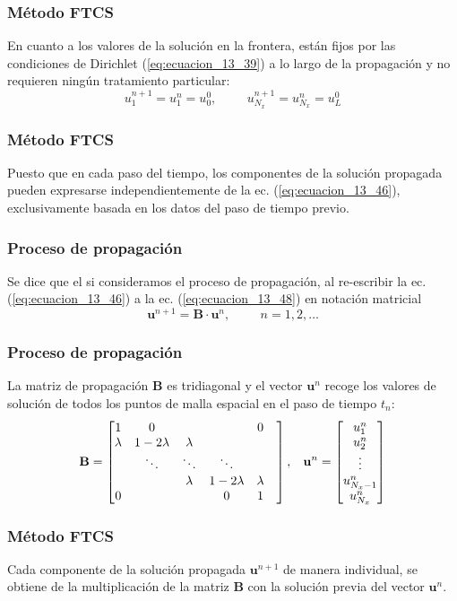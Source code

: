 \documentclass[12pt]{beamer}
\begin{document}
\begin{frame}
\frametitle{Método FTCS}
En cuanto a los valores de la solución en la frontera, están fijos por las condiciones de Dirichlet (\ref{eq:ecuacion_13_39}) a lo largo de la propagación y no requieren ningún tratamiento particular:
\begin{equation}
u_{1}^{n + 1} = u_{1}^{n} = u_{0}^{0}, \hspace{1cm} u_{N_{x}}^{n + 1} = u_{N_{x}}^{n} = u_{L}^{0}
\label{eq:ecuacion_13_48}
\end{equation}
\end{frame}
\begin{frame}
\frametitle{Método FTCS}
Puesto que en cada paso del tiempo, los componentes de la solución propagada pueden expresarse independientemente de la ec. (\ref{eq:ecuacion_13_46}), exclusivamente basada en los datos del paso de tiempo previo.
\end{frame}
\begin{frame}
\frametitle{Proceso de propagación}
Se dice que el  si consideramos el proceso de propagación, al re-escribir la ec. (\ref{eq:ecuacion_13_46}) a la ec. (\ref{eq:ecuacion_13_48}) en notación matricial
\begin{equation}
\mathbf{u}^{n + 1} =  \mathbf{B} \cdot \mathbf{u}^{n}, \hspace{1cm} n = 1, 2, \ldots
\label{eq:ecuacion_13_49}
\end{equation}
\end{frame}
\begin{frame}
\frametitle{Proceso de propagación}
La matriz de propagación $\mathbf{B}$ es tridiagonal y el vector $\mathbf{u}^{n}$ recoge los valores de solución de todos los puntos de malla espacial en el paso de tiempo $t_{n}$:
\fontsize{12}{12}\selectfont
\begin{equation}
\mathbf{B} = \begin{bmatrix}
1 & 0 & & & 0 \\
\lambda & 1 - 2 \lambda & \lambda & & & \\
 & \ddots & \ddots & \ddots & \\
 & & \lambda & 1 - 2 \lambda & \lambda \\
 0 & & & 0 & 1
\end{bmatrix},
\hspace{0.3cm}
\mathbf{u}^{n} = 
\begin{bmatrix}
u_{1}^{n} \\
u_{2}^{n} \\
\vdots \\
u_{N_{x} - 1}^{n} \\
u_{N_{x}}^{n} 
\end{bmatrix}
\label{eq:ecuacion_13_50}
\end{equation}
\end{frame}
\begin{frame}
\frametitle{Método FTCS}
Cada componente de la solución propagada $\mathbf{u}^{n+1}$ de manera individual, se obtiene de la multiplicación de la matriz $\mathbf{B}$ con la solución previa del vector $\mathbf{u}^{n}$.
\end{frame}
\end{document}
